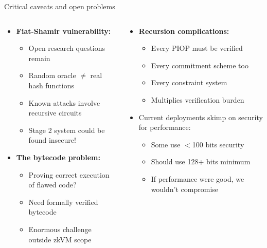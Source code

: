\documentclass[aspectratio=169, lualatex, handout]{beamer}
\begin{document}
\begin{frame}{Critical caveats and open problems}
	\begin{columns}[c]
		\begin{column}{0.5\textwidth}
			\begin{itemize}
				\item \textbf{Fiat-Shamir vulnerability:}
				      \begin{itemize}
					      \item Open research questions remain
					      \item Random oracle $\neq$ real hash functions
					      \item Known attacks involve recursive circuits
					      \item Stage 2 system could be found insecure!
				      \end{itemize}
				\item \textbf{The bytecode problem:}
				      \begin{itemize}
					      \item Proving correct execution of flawed code?
					      \item Need formally verified bytecode
					      \item Enormous challenge outside zkVM scope
				      \end{itemize}
			\end{itemize}
		\end{column}
		\begin{column}{0.5\textwidth}
			\begin{itemize}
				\item \textbf{Recursion complications:}
				      \begin{itemize}
					      \item Every PIOP must be verified
					      \item Every commitment scheme too
					      \item Every constraint system
					      \item Multiplies verification burden
				      \end{itemize}
			\end{itemize}
			\begin{itemize}
				\item Current deployments skimp on security for performance:
				      \begin{itemize}
					      \item Some use $<$100 bits security
					      \item Should use 128+ bits minimum
					      \item If performance were good, we wouldn't compromise
				      \end{itemize}
			\end{itemize}
		\end{column}
	\end{columns}
\end{frame}
\end{document}
